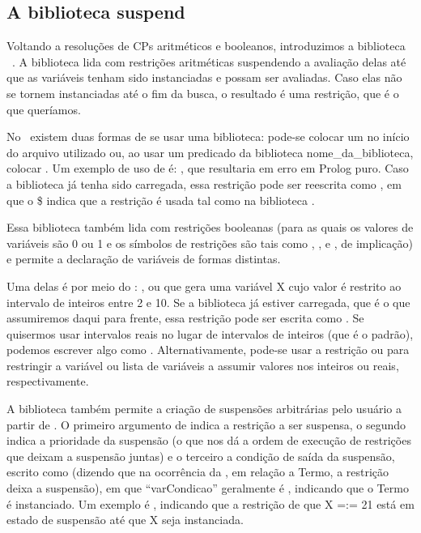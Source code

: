 \documentclass{article}
\begin{document}
\subsection{A biblioteca suspend}

Voltando a resoluções de CPs aritméticos e booleanos, introduzimos a biblioteca \eclipse\ . A biblioteca  lida com restrições aritméticas suspendendo a avaliação delas até que as variáveis tenham sido instanciadas e possam ser avaliadas. Caso elas não se tornem instanciadas até o fim da busca, o resultado é uma restrição, que é o que queríamos.

No \eclipse\ existem duas formas de se usar uma biblioteca: pode-se colocar um  no início do arquivo utilizado ou, ao usar um predicado da biblioteca nome\_da\_biblioteca, colocar . Um exemplo de uso de  é: , que resultaria em erro em Prolog puro. Caso a biblioteca  já tenha sido carregada, essa restrição pode ser reescrita como ,
em que o \$ indica que a restrição é usada tal como na biblioteca .

Essa biblioteca também lida com restrições booleanas (para as quais os valores de variáveis são 0 ou
1 e os símbolos de restrições são tais como , ,  e
, de implicação) e permite a declaração de variáveis de formas distintas.

Uma delas é por meio do : , ou   %
que gera uma variável X cujo valor é restrito ao intervalo de inteiros entre 2 e 10. Se a biblioteca já estiver carregada, que é o que assumiremos daqui para frente, essa restrição pode ser escrita como . %
Se quisermos usar intervalos reais no lugar de intervalos de inteiros (que é o padrão), podemos escrever algo como .
Alternativamente, pode-se usar a restrição  ou  para restringir a variável ou lista de variáveis a assumir valores nos inteiros ou reais, respectivamente.



A biblioteca  também permite a criação de suspensões arbitrárias pelo usuário a
partir de . O primeiro argumento de  indica a restrição a ser
suspensa, o segundo indica a prioridade da suspensão (o que nos dá a ordem de execução de restrições
que deixam a suspensão juntas) e o terceiro a condição de saída da suspensão, escrito como
 (dizendo que na ocorrência da , em relação a Termo, a restrição deixa a suspensão), em que
``var{Condicao}'' geralmente é , indicando que o Termo é instanciado.
Um exemplo é , indicando que a restrição de que X =:= 21 está em estado de suspensão até que X seja instanciada.
\end{document}
